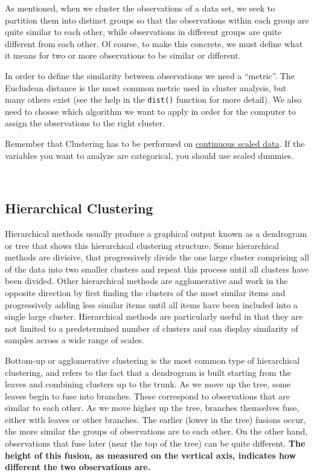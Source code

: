 \documentclass[
]{svmono}
\begin{document}
As mentioned, when we cluster the observations of a data set, we seek to
partition them into distinct groups so that the observations within each
group are quite similar to each other, while observations in different
groups are quite different from each other. Of course, to make this
concrete, we must define what it means for two or more observations to
be similar or different.

In order to define the similarity between observations we need a
``metric''. The Eucludean distance is the most common metric used in
cluster analysis, but many others exist (see the help in the \texttt{dist()}
function for more detail). We also need to choose which algorithm we
want to apply in order for the computer to assign the observations to
the right cluster.

Remember that Clustering has to be performed on \ul{continuous scaled
data}. If the variables you want to analyze are categorical,
you should use scaled dummies.

~

\hypertarget{hierarchical-clustering}{%
\subsection{Hierarchical Clustering}\label{hierarchical-clustering}}

Hierarchical methods usually produce a graphical output known as a
dendrogram or tree that shows this hierarchical clustering structure.
Some hierarchical methods are divisive, that progressively divide the
one large cluster comprising all of the data into two smaller clusters
and repeat this process until all clusters have been divided. Other
hierarchical methods are agglomerative and work in the opposite
direction by first finding the clusters of the most similar items and
progressively adding less similar items until all items have been
included into a single large cluster. Hierarchical methods are
particularly useful in that they are not limited to a predetermined
number of clusters and can display similarity of samples across a wide
range of scales.

Bottom-up or agglomerative clustering is the most common type of
hierarchical clustering, and refers to the fact that a dendrogram is
built starting from the leaves and combining clusters up to the trunk.
As we move up the tree, some leaves begin to fuse into branches. These
correspond to observations that are similar to each other. As we move
higher up the tree, branches themselves fuse, either with leaves or
other branches. The earlier (lower in the tree) fusions occur, the more
similar the groups of observations are to each other. On the other hand,
observations that fuse later (near the top of the tree) can be quite
different. \textbf{The height of this fusion, as measured on the vertical
axis, indicates how different the two observations are.}
\end{document}
